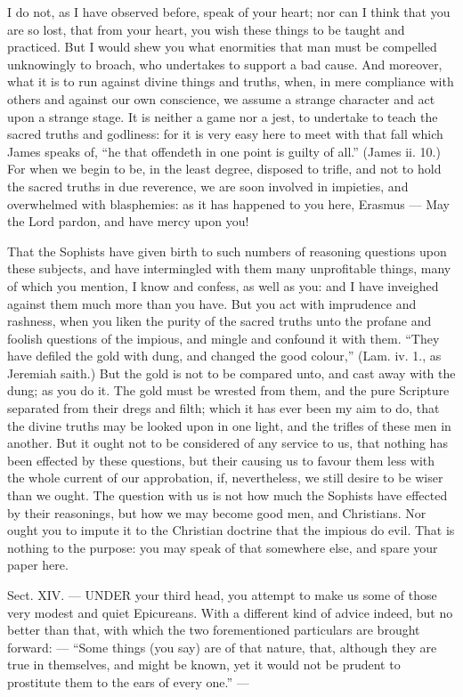 I do not, as I have observed before, speak of your heart; nor can I think that you are so lost, that from your heart, you wish these things to be taught and practiced. But I would shew you what enormities that man must be compelled unknowingly to broach, who undertakes to support a bad cause. And moreover, what it is to run against divine things and truths, when, in mere compliance with others and against our own conscience, we assume a strange character and act upon a strange stage. It is neither a game nor a jest, to undertake to teach the sacred truths and godliness: for it is very easy here to meet with that fall which James speaks of, “he that offendeth in one point is guilty of all.” (James ii. 10.) For when we begin to be, in the least degree, disposed to trifle, and not to hold the sacred truths in due reverence, we are soon involved in impieties, and overwhelmed with blasphemies: as it has happened to you here, Erasmus — May the Lord pardon, and have mercy upon you!

That the Sophists have given birth to such numbers of reasoning questions upon these subjects, and have intermingled with them many unprofitable things, many of which you mention, I know and confess, as well as you: and I have inveighed against them much more than you have. But you act with imprudence and rashness, when you liken the purity of the sacred truths unto the profane and foolish questions of the impious, and mingle and confound it with them. “They have defiled the gold with dung, and changed the good colour,” (Lam. iv. 1., as Jeremiah saith.) But the gold is not to be compared unto, and cast away with the dung; as you do it. The gold must be wrested from them, and the pure Scripture separated from their dregs and filth; which it has ever been my aim to do, that the divine truths may be looked upon in one light, and the trifles of these men in another. But it ought not to be considered of any service to us, that nothing has been effected by these questions, but their causing us to favour them less with the whole current of our approbation, if, nevertheless, we still desire to be wiser than we ought. The question with us is not how much the Sophists have effected by their reasonings, but how we may become good men, and Christians. Nor ought you to impute it to the Christian doctrine that the impious do evil. That is nothing to the purpose: you may speak of that somewhere else, and spare your paper here.


Sect. XIV. — UNDER your third head, you attempt to make us some of those very modest and quiet Epicureans. With a different kind of advice indeed, but no better than that, with which the two forementioned particulars are brought forward: — “Some things (you say) are of that nature, that, although they are true in themselves, and might be known, yet it would not be prudent to prostitute them to the ears of every one.” —


